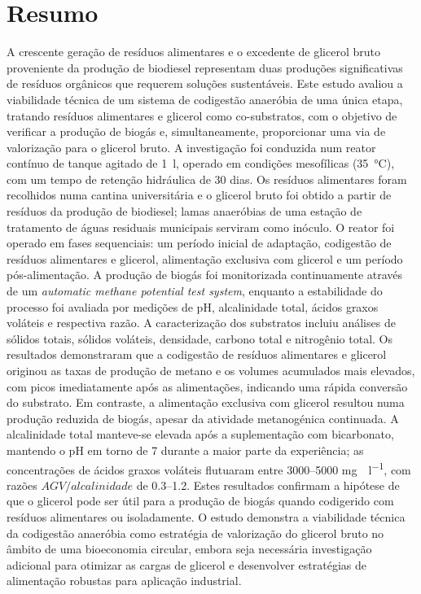 \chapter*{Resumo}
\label{ch:resumo}

A crescente geração de resíduos alimentares e o excedente de glicerol bruto proveniente da produção de biodiesel representam duas produções significativas de resíduos orgânicos que requerem soluções sustentáveis. Este estudo avaliou a viabilidade técnica de um sistema de codigestão anaeróbia de uma única etapa, tratando resíduos alimentares e glicerol como co-substratos, com o objetivo de verificar a produção de biogás e, simultaneamente, proporcionar uma via de valorização para o glicerol bruto. A investigação foi conduzida num reator contínuo de tanque agitado de \qty{1}{\litre}, operado em condições mesofílicas (\qty{35}{\celsius}), com um tempo de retenção hidráulica de \num{30} dias. Os resíduos alimentares foram recolhidos numa cantina universitária e o glicerol bruto foi obtido a partir de resíduos da produção de biodiesel; lamas anaeróbias de uma estação de tratamento de águas residuais municipais serviram como inóculo. O reator foi operado em fases sequenciais: um período inicial de adaptação, codigestão de resíduos alimentares e glicerol, alimentação exclusiva com glicerol e um período pós-alimentação. A produção de biogás foi monitorizada continuamente através de um \textit{automatic methane potential test system}, enquanto a estabilidade do processo foi avaliada por medições de pH, alcalinidade total, ácidos graxos voláteis e respectiva razão. A caracterização dos substratos incluiu análises de sólidos totais, sólidos voláteis, densidade, carbono total e nitrogênio total. Os resultados demonstraram que a codigestão de resíduos alimentares e glicerol originou as taxas de produção de metano e os volumes acumulados mais elevados, com picos imediatamente após as alimentações, indicando uma rápida conversão do substrato. Em contraste, a alimentação exclusiva com glicerol resultou numa produção reduzida de biogás, apesar da atividade metanogénica continuada. A alcalinidade total manteve-se elevada após a suplementação com bicarbonato, mantendo o pH em torno de \num{7} durante a maior parte da experiência; as concentrações de ácidos graxos voláteis flutuaram entre \numrange{3000}{5000} \unit{\milli\gram{}\per\litre}, com razões $AGV/alcalinidade$ de \numrange{0,3}{1,2}. Estes resultados confirmam a hipótese de que o glicerol pode ser útil para a produção de biogás quando codigerido com resíduos alimentares ou isoladamente. O estudo demonstra a viabilidade técnica da codigestão anaeróbia como estratégia de valorização do glicerol bruto no âmbito de uma bioeconomia circular, embora seja necessária investigação adicional para otimizar as cargas de glicerol e desenvolver estratégias de alimentação robustas para aplicação industrial.
